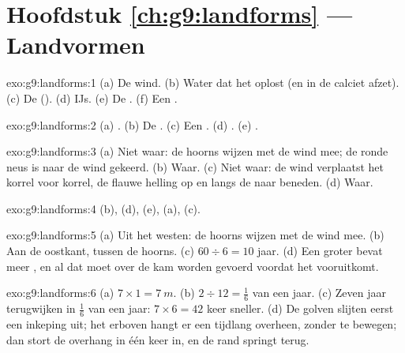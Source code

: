 \section*{Hoofdstuk \ref{ch:g9:landforms} --- Landvormen}

\begin{solution}{exo:g9:landforms:1}
(a) De wind. (b) Water dat het  oplost (en in de  calciet
afzet). (c) De  (). (d) IJs. (e) De . (f) Een
.
\end{solution}

\begin{solution}{exo:g9:landforms:2}
(a) . (b) De . (c) Een . (d) .
(e) .
\end{solution}

\begin{solution}{exo:g9:landforms:3}
(a) Niet waar: de hoorns wijzen met de wind mee; de ronde neus is naar de
wind gekeerd. (b) Waar. (c) Niet waar: de wind verplaatst het korrel voor
korrel, de flauwe helling op en langs de  naar beneden. (d) Waar.
\end{solution}

\begin{solution}{exo:g9:landforms:4}
(b), (d), (e), (a), (c).
\end{solution}

\begin{solution}{exo:g9:landforms:5}
(a) Uit het westen: de hoorns wijzen met de wind mee. (b) Aan de oostkant,
tussen de hoorns. (c) $60 \div 6 = 10$ jaar. (d) Een groter  bevat meer
, en al dat  moet over de kam worden gevoerd voordat het 
vooruitkomt.
\end{solution}

\begin{solution}{exo:g9:landforms:6}
(a) $7 \times 1 = \qty{7}{m}$. (b) $2 \div 12 = \frac{1}{6}$ van een jaar.
(c) Zeven jaar terugwijken in $\frac{1}{6}$ van een jaar: $7 \times 6 = 42$
keer sneller. (d) De golven slijten eerst een inkeping uit; het 
erboven hangt er een tijdlang overheen, zonder te bewegen; dan stort de
overhang in één keer in, en de rand springt terug.
\end{solution}

